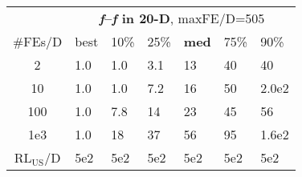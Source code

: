\begin{tabular}{c|llllll}
 & \multicolumn{6}{|c}{\textbf{\textit{f}\raisebox{-0.35ex}{1}--\textit{f}\raisebox{-0.35ex}{24} in 20-D}, maxFE/D=505}\\
\#FEs/D & best & 10\% & 25\% & \textbf{med} & 75\% & 90\%\\
2 & \hspace*{1ex}1.0 & \hspace*{1ex}1.0 & \hspace*{1ex}3.1 & 13 & 40 & 40\\
10 & \hspace*{1ex}1.0 & \hspace*{1ex}1.0 & \hspace*{1ex}7.2 & 16 & 50 & 2.0e2\\
100 & \hspace*{1ex}1.0 & \hspace*{1ex}7.8 & 14 & 23 & 45 & 56\\
1e3 & \hspace*{1ex}1.0 & 18 & 37 & 56 & 95 & 1.6e2\\
$\text{RL}_{\text{US}}$/D & 5e2 & 5e2 & 5e2 & 5e2 & 5e2 & 5e2
\end{tabular}
